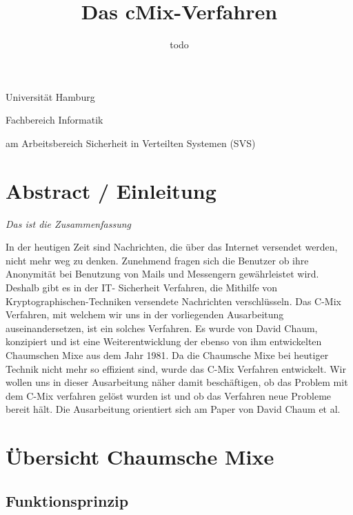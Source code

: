 \documentclass[
    fontsize=12pt,
    headings=small,
    parskip=half,           %
    bibliography=totoc,
    numbers=noenddot,       %
    open=any,               %
    ]{scrreprt}
\title{Das cMix-Verfahren}
\author{todo}
\begin{document}
\begin{titlepage}
\begin{center}\Large
    Universität Hamburg \par
    Fachbereich Informatik
    \vfill
    \makeatletter
    {\Large\textsf{\textbf{\@title}}\par}
    \makeatother
    \bigskip
    am Arbeitsbereich Sicherheit in Verteilten Systemen (SVS) \par
    \bigskip
    \makeatletter
    {\@author} \par
    \makeatother
    \bigskip
    \makeatletter
    {\@date}
    \makeatother
    \vfill

\end{center}
\end{titlepage}

\tableofcontents

\chapter*{Abstract / Einleitung}
\textit{Das ist die Zusammenfassung}

In der heutigen Zeit sind Nachrichten, die über das Internet versendet werden, nicht
mehr weg zu denken. Zunehmend fragen sich die Benutzer ob ihre Anonymität bei
Benutzung von Mails und Messengern gewährleistet wird. Deshalb gibt es in der IT-
Sicherheit Verfahren, die Mithilfe von Kryptographischen-Techniken versendete
Nachrichten verschlüsseln. Das C-Mix Verfahren, mit welchem wir uns in der
vorliegenden Ausarbeitung auseinandersetzen, ist ein solches Verfahren. Es
wurde von David Chaum, konzipiert und ist eine
Weiterentwicklung der ebenso von ihm entwickelten Chaumschen Mixe aus dem Jahr
1981. Da die Chaumsche Mixe bei heutiger Technik nicht mehr so effizient sind,
wurde das C-Mix Verfahren entwickelt.
Wir wollen uns in dieser Ausarbeitung
näher damit beschäftigen, ob das Problem mit dem C-Mix verfahren gelöst wurden ist
und ob das Verfahren neue Probleme bereit hält.
Die Ausarbeitung orientiert sich am Paper \cite{DBLP:journals/iacr/DavidChaumJKKRS16} von David Chaum et al.


\chapter{Übersicht Chaumsche Mixe}

\section{Funktionsprinzip}
\end{document}
